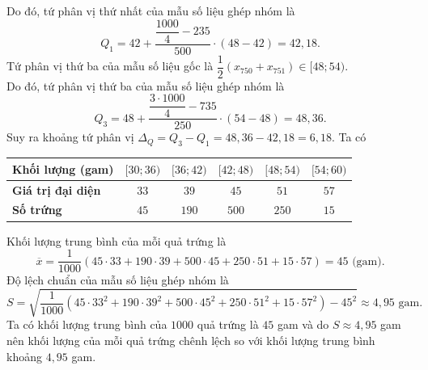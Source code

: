 \begin{ex}
{\begin{itemchoice}
			Do đó, tứ phân vị thứ nhất của mẫu số liệu ghép nhóm là
			$$ Q_1 = 42 + \dfrac{\dfrac{1000}{4} - 235}{500} \cdot (48 - 42) = 42{,}18.$$
			Tứ phân vị thứ ba của mẫu số liệu gốc là $\dfrac{1}{2}(x_{750} + x_{751}) \in [48; 54)$.\\
			Do đó, tứ phân vị thứ ba của mẫu số liệu ghép nhóm là
			$$ Q_3 = 48 + \dfrac{\dfrac{3\cdot 1000}{4} - 735}{250} \cdot (54 - 48) = 48{,}36.$$
			Suy ra khoảng tứ phân vị $\Delta_Q = Q_3 - Q_1 = 48{,}36 - 42{,}18 = 6{,}18$.
			\itemch Ta có
			\begin{center}
				\begin{tabular}{|l|c|c|c|c|c|}
					\hline
					\textbf{Khối lượng (gam)} & $[30; 36)$ & $ [36; 42)$ & $ [42; 48)$ & $ [48; 54)$ & $ [54; 60)$   \\
					\hline
					\textbf{Giá trị đại diện} & $33$ & $39$ & $45$ & $51$ & $57$ \\ \hline
					\textbf{Số trứng }&$45$ & $190$ & $500$ & $250$ & $15$ \\ 
					\hline
				\end{tabular}
			\end{center}
			Khối lượng trung bình của mỗi quả trứng là $$\overline{x} = \dfrac{1}{1000}\left(45\cdot 33 + 190\cdot 39 + 500\cdot 45 + 250\cdot 51 + 15\cdot 57\right) = 45 \text{ (gam)}.$$
			Độ lệch chuẩn của mẫu số liệu ghép nhóm là
			$$S = \sqrt{\dfrac{1}{1000}\left(45\cdot 33^2 + 190\cdot 39^2 + 500\cdot 45^2 + 250\cdot 51^2 + 15\cdot 57^2\right) - 45^2} \approx 4{,}95 \text{ gam}.$$
			\itemch Ta có khối lượng trung bình của $1000$ quả trứng là $45$ gam và do $S \approx 4{,}95$ gam nên khối lượng của mỗi quả trứng chênh lệch so với khối lượng trung bình khoảng $4{,}95$ gam.
		\end{itemchoice}
	}
\end{ex}

